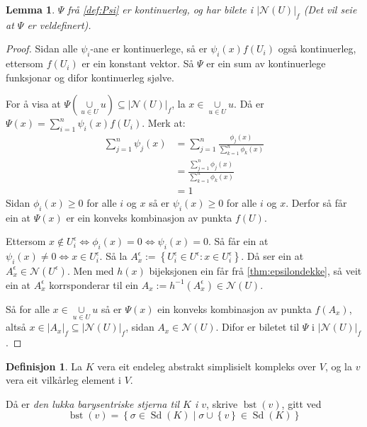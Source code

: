 \documentclass[a4paper, 12pt, norsk]{article}
\theoremstyle{plain}
\newtheorem{lemma}[theorem]{Lemma}
\theoremstyle{definition}
\newtheorem{definition}[theorem]{Definisjon}
\newcommand{\Nc}{\mathcal{N}}
\newcommand{\union}{ \mathop{\cup}\limits }
\newcommand{\gr}[1]{ \lvert #1 \rvert } %
\newcommand{\set}[1]{ \left\{ #1 \right\} } %
\newcommand{\tuple}[1]{ \left( #1 \right) } %
\DeclareMathOperator{\Sd}{Sd} %
\DeclareMathOperator{\bst}{bst} %
\begin{document}
\begin{lemma} \label{thm:psi-kont}
	\( \Psi \) frå \autoref{def:Psi} er kontinuerleg, og har bilete i \( \gr{\Nc(U)}_f \) (Det vil seie at \( \Psi \) er veldefinert).
\end{lemma}

\begin{proof}
	Sidan alle \( \psi_i \)-ane er kontinuerlege, så er \( \psi_i(x) f(U_i) \) også kontinuerleg, ettersom \( f(U_i) \) er ein konstant vektor. Så \( \Psi \) er ein sum av kontinuerlege funksjonar og difor kontinuerleg sjølve.

	For å visa at \( \Psi\tuple{\union_{u \in U} u} \subseteq \gr{\Nc(U)}_f \), la \( x \in \union_{u \in U} u \). Då er \( \Psi(x) = \sum_{i=1}^n \psi_i(x)f(U_i) \). Merk at:
	\begin{align*}
		\sum_{j=1}^n \psi_j(x)  &= \sum_{j=1}^n \frac{\phi_j(x)}{\sum_{k=1}^n \phi_k(x)} \\
		&= \frac{\sum_{j=1}^n \phi_j(x)}{\sum_{k=1}^n \phi_k(x)} \\
		&= 1
	\end{align*}
	Sidan \( \phi_i(x) \geq 0 \) for alle \( i \) og \( x \) så er \( \psi_i(x) \geq 0 \) for alle \( i \) og \( x \). Derfor så får ein at \( \Psi(x) \) er ein konveks kombinasjon av punkta \( f(U) \).

	Ettersom \( x \not\in U_i^\epsilon \iff \phi_i(x) = 0 \iff \psi_i(x) = 0 \). Så får ein at \( \psi_i(x) \neq 0 \iff x \in U_i^\epsilon \). Så la \( A_x^\epsilon := \set{U_i^\epsilon \in U^\epsilon : x \in U_i^\epsilon} \). Då ser ein at \( A_x^\epsilon \in \Nc(U^\epsilon) \). Men med \( h(x) \) bijeksjonen ein får frå \autoref{thm:epsilondekke}, så veit ein at \( A_x^\epsilon \) korrsponderar til ein \( A_x := h^{-1}(A_x^\epsilon) \in \Nc(U) \).
	
	Så for alle \( x \in \union_{u \in U} u \) så er \( \Psi(x) \) ein konveks kombinasjon av punkta \( f(A_x) \), altså \( x \in \gr{A_x}_f \subseteq \gr{\Nc(U)}_f \), sidan \( A_x \in \Nc(U) \). Difor er biletet til \( \Psi \) i \( \gr{\Nc(U)}_f \).
\end{proof}

\begin{definition} \label{def:bst}
	La \( K \) vera eit endeleg abstrakt simplisielt kompleks over \( V \), og la \( v \) vera eit vilkårleg element i \( V \).
	
	Då er \emph{den lukka barysentriske stjerna til \( K \) i \( v \)}, skrive \( \bst(v) \), gitt ved
	\[
		\bst(v) = \set{\sigma \in \Sd(K) \mid \sigma \union \set{v} \in \Sd(K)}
	\]
\end{definition}
\end{document}
